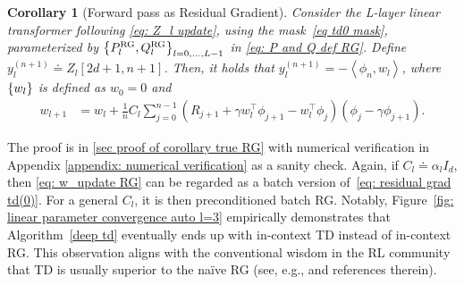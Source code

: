 \documentclass{article}
\newcommand{\indot}[2]{{\left<#1, #2\right>}}
\newcommand{\rg}{\text{RG}}
\newtheorem{corollary}{Corollary}
\begin{document}
\begin{corollary}[Forward pass as Residual Gradient]
    \label{corollary: true RG}
    Consider the L-layer linear transformer following \eqref{eq: Z_l update}, using the mask~\eqref{eq td0 mask}, parameterized by $\qty{P_l^{\rg}, Q_l^{\rg}}_{l=0,\dots, L-1}$ in \eqref{eq: P and Q def RG}.
    Define $y_l^{(n+1)} \doteq Z_l[2d+1, n+1]$.
    Then, it holds that $y_l^{(n+1)} =  - \indot{\phi_n}{w_l}$,
    where $\qty{w_l}$ is defined as $w_0 = 0$ and
    \begin{align}
     w_{l+1} &= \textstyle w_l + \frac{1}{n} C_l \sum_{j=0}^{n-1}  \left(R_{j+1} + \gamma w_l^\top\phi_{j+1} - w_l^\top\phi_j\right)(\phi_j - \gamma \phi_{j+1}). \label{eq: w_update RG}
    \end{align}
\end{corollary}
The proof is in \ref{sec proof of corollary true RG} with numerical verification in Appendix \ref{appendix: numerical verification} as a sanity check.
Again,
if $C_l \doteq \alpha_l I_d$,
then \eqref{eq: w_update RG} can be regarded as a batch version of~\eqref{eq: residual grad td(0)}.
For a general $C_l$,
it is then preconditioned batch RG.
Notably, Figure~\ref{fig: linear parameter convergence auto l=3} empirically  demonstrates that Algorithm~\ref{deep td} eventually ends up with in-context TD instead of in-context RG.
This observation aligns with the conventional wisdom in the RL community that TD is usually superior to the naïve RG (see, e.g., \citet{zhang2019deep} and references therein).

\end{document}
